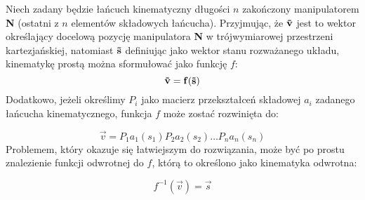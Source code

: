 \documentclass[11pt]{mwrep}
\begin{document}
 Niech zadany będzie łańcuch kinematyczny długości $n$ zakończony manipulatorem \textbf{N} (ostatni z $n$ elementów składowych łańcucha). Przyjmując, że $\bf\vec{v}$ jest to wektor określający docelową pozycję manipulatora \textbf{N} w trójwymiarowej przestrzeni kartezjańskiej, natomiast $\bf\vec{s}$ definiując jako wektor stanu rozważanego układu, kinematykę prostą można sformułować jako funkcję $f$:
$$
\bf\vec{v} = f(\bf\vec{s})
$$
Dodatkowo, jeżeli określimy $P_i$ jako macierz przekształceń składowej $a_i$ zadanego łańcucha kinematycznego, funkcja $f$ może zostać rozwinięta do:

$$
{\vec{v}} = P_1a_1({s_1})P_2a_2({s_2}) \dots P_na_n({s_n})
$$
Problemem, który okazuje się łatwiejszym do rozwiązania, może być po prostu znalezienie funkcji odwrotnej do $f$, którą to określono jako kinematyka odwrotna:

$$
f^{-1} (\vec{v})  = \vec{s}
$$
\end{document}
